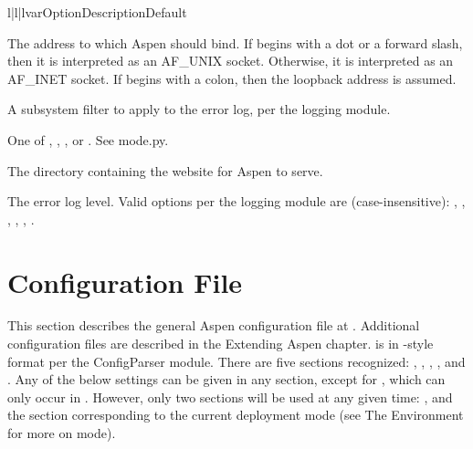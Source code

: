 \begin{tableiii}{l|l|l}{var}{Option}{Description}{Default}

    {The address to which Aspen should bind. If  begins
    with a dot or a forward slash, then it is interpreted as an AF_UNIX socket.
    Otherwise, it is interpreted as an AF_INET socket. If  begins
    with a colon, then the loopback address is assumed.} {}

    {A subsystem filter to apply to the error log, per the logging module.}
    {\code{}}

    {One of , , , or
    . See mode.py.} {}

    {The directory containing the website for Aspen to serve.}
    {}

    {The error log level. Valid options per the logging module
    are (case-insensitive): , , ,
    , , .}{}

\end{tableiii}


\section{Configuration File \label{config-file}}

This section describes the general Aspen configuration file at
. Additional configuration files are described in the
Extending Aspen chapter.  is in -style format per
the ConfigParser module. There are five sections recognized: ,
, , , and . Any
of the below settings can be given in any section, except for , which
can only occur in . However, only two sections will be used at any
given time: , and the section corresponding to the current
deployment mode (see The Environment for more on mode).

